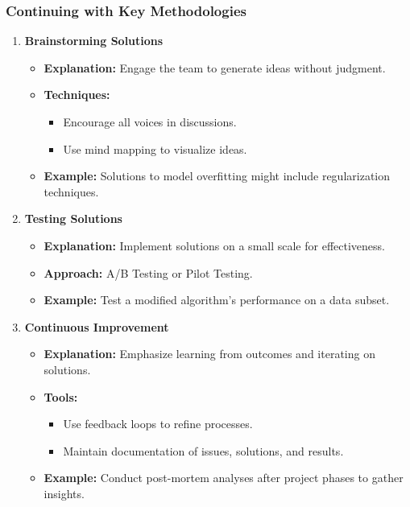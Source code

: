 \documentclass{beamer}
\begin{document}
\begin{frame}[fragile]
    \frametitle{Continuing with Key Methodologies}
    \begin{enumerate}[resume]
        \item \textbf{Brainstorming Solutions}
            \begin{itemize}
                \item \textbf{Explanation:} Engage the team to generate ideas without judgment.
                \item \textbf{Techniques:}
                    \begin{itemize}
                        \item Encourage all voices in discussions.
                        \item Use mind mapping to visualize ideas.
                    \end{itemize}
                \item \textbf{Example:} Solutions to model overfitting might include regularization techniques.
            \end{itemize}
        
        \item \textbf{Testing Solutions}
            \begin{itemize}
                \item \textbf{Explanation:} Implement solutions on a small scale for effectiveness.
                \item \textbf{Approach:} A/B Testing or Pilot Testing.
                \item \textbf{Example:} Test a modified algorithm's performance on a data subset.
            \end{itemize}

        \item \textbf{Continuous Improvement}
            \begin{itemize}
                \item \textbf{Explanation:} Emphasize learning from outcomes and iterating on solutions.
                \item \textbf{Tools:}
                    \begin{itemize}
                        \item Use feedback loops to refine processes.
                        \item Maintain documentation of issues, solutions, and results.
                    \end{itemize}
                \item \textbf{Example:} Conduct post-mortem analyses after project phases to gather insights.
            \end{itemize}
    \end{enumerate}
\end{frame}
\end{document}
